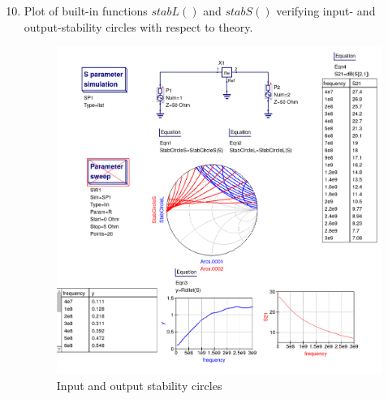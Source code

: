 \documentclass{article}
\begin{document}
\begin{enumerate}[label=(\alph*)]
\setcounter{enumi}{9}
\item Plot of built-in functions $stabL()$ and $stabS()$ 
verifying input- and output-stability circles with respect to theory.
\begin{figure}[H]
  \includegraphics[width=\linewidth]{tline9.png}
  \caption{Input and output stability circles}
 \label{fig4}
\end{figure}
\end{enumerate}
\end{document}
